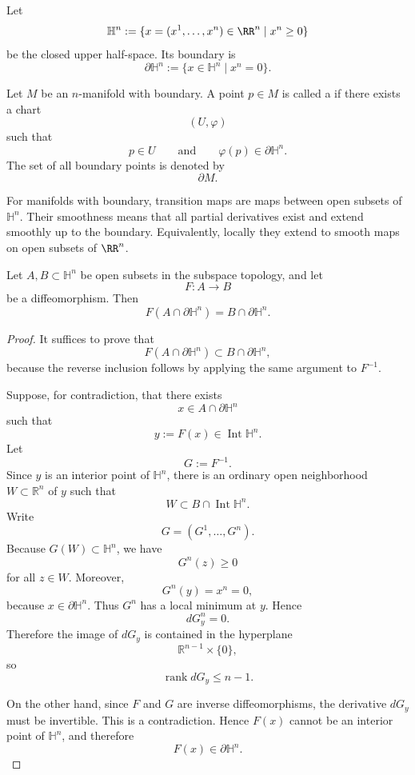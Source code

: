 \begin{definition}
Let
\[
  \mathbb H^n
  :=
  \{x=(x^1,\dots,x^n)\in\RR^n\mid x^n\ge 0\}
\]
be the closed upper half-space. Its boundary is
\[
  \partial \mathbb H^n
  :=
  \{x\in\mathbb H^n\mid x^n=0\}.
\]
\end{definition}

\begin{definition}
Let $M$ be an $n$-manifold with boundary. A point $p\in M$ is called a  if there exists a chart
\[
  (U,\varphi)
\]
such that
\[
  p\in U
  \qquad\text{and}\qquad
  \varphi(p)\in \partial\mathbb H^n.
\]
The set of all boundary points is denoted by
\[
  \partial M.
\]
\end{definition}

For manifolds with boundary, transition maps are maps between open subsets of $\mathbb H^n$. Their smoothness means that all partial derivatives exist and extend smoothly up to the boundary. Equivalently, locally they extend to smooth maps on open subsets of $\RR^n$.

\begin{lemma}
Let $A,B\subset \mathbb H^n$ be open subsets in the subspace topology, and let
\[
  F:A\to B
\]
be a diffeomorphism. Then
\[
  F(A\cap \partial \mathbb H^n)=B\cap \partial \mathbb H^n.
\]
\end{lemma}

\begin{proof}
It suffices to prove that
\[
  F(A\cap \partial\mathbb H^n)\subset B\cap \partial\mathbb H^n,
\]
because the reverse inclusion follows by applying the same argument to
$F^{-1}$.

Suppose, for contradiction, that there exists
\[
  x\in A\cap \partial\mathbb H^n
\]
such that
\[
  y:=F(x)\in \operatorname{Int}\mathbb H^n.
\]
Let
\[
  G:=F^{-1}.
\]
Since $y$ is an interior point of $\mathbb H^n$, there is an ordinary open
neighborhood $W\subset \mathbb R^n$ of $y$ such that
\[
  W\subset B\cap \operatorname{Int}\mathbb H^n.
\]
Write
\[
  G=(G^1,\ldots,G^n).
\]
Because $G(W)\subset \mathbb H^n$, we have
\[
  G^n(z)\ge 0
\]
for all $z\in W$. Moreover,
\[
  G^n(y)=x^n=0,
\]
because $x\in\partial\mathbb H^n$. Thus $G^n$ has a local minimum at $y$.
Hence
\[
  dG^n_y=0.
\]
Therefore the image of $dG_y$ is contained in the hyperplane
\[
  \mathbb R^{n-1}\times\{0\},
\]
so
\[
  \operatorname{rank} dG_y\le n-1.
\]

On the other hand, since $F$ and $G$ are inverse diffeomorphisms, the derivative
$dG_y$ must be invertible. This is a contradiction. Hence $F(x)$ cannot be an
interior point of $\mathbb H^n$, and therefore
\[
  F(x)\in \partial\mathbb H^n.
\]
\end{proof}

